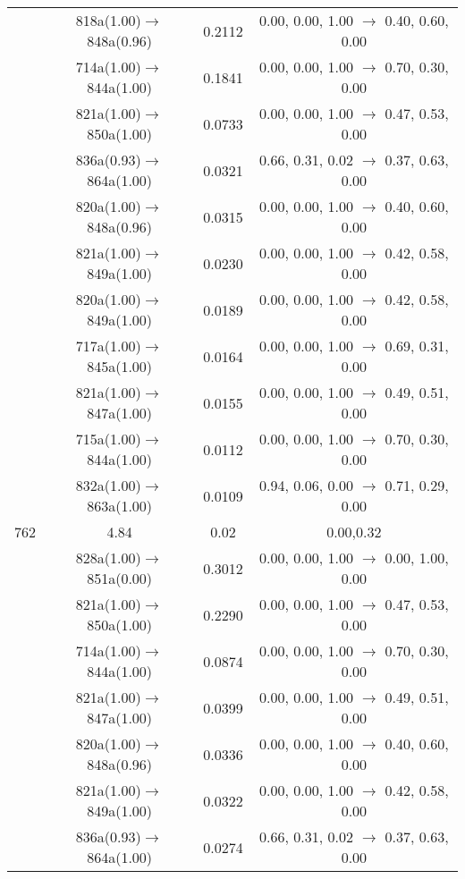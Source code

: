 \documentclass[10pt,a4paper]{article}
\begin{document}
\begin{longtable}{c|c|c|c}
 	& 818a(1.00)$\rightarrow$848a(0.96) &	 0.2112 &	 0.00, 0.00, 1.00 $\rightarrow$ 0.40, 0.60, 0.00 \\ 
 	& 714a(1.00)$\rightarrow$844a(1.00) &	 0.1841 &	 0.00, 0.00, 1.00 $\rightarrow$ 0.70, 0.30, 0.00 \\ 
 	& 821a(1.00)$\rightarrow$850a(1.00) &	 0.0733 &	 0.00, 0.00, 1.00 $\rightarrow$ 0.47, 0.53, 0.00 \\ 
 	& 836a(0.93)$\rightarrow$864a(1.00) &	 0.0321 &	 0.66, 0.31, 0.02 $\rightarrow$ 0.37, 0.63, 0.00 \\ 
 	& 820a(1.00)$\rightarrow$848a(0.96) &	 0.0315 &	 0.00, 0.00, 1.00 $\rightarrow$ 0.40, 0.60, 0.00 \\ 
 	& 821a(1.00)$\rightarrow$849a(1.00) &	 0.0230 &	 0.00, 0.00, 1.00 $\rightarrow$ 0.42, 0.58, 0.00 \\ 
 	& 820a(1.00)$\rightarrow$849a(1.00) &	 0.0189 &	 0.00, 0.00, 1.00 $\rightarrow$ 0.42, 0.58, 0.00 \\ 
 	& 717a(1.00)$\rightarrow$845a(1.00) &	 0.0164 &	 0.00, 0.00, 1.00 $\rightarrow$ 0.69, 0.31, 0.00 \\ 
 	& 821a(1.00)$\rightarrow$847a(1.00) &	 0.0155 &	 0.00, 0.00, 1.00 $\rightarrow$ 0.49, 0.51, 0.00 \\ 
 	& 715a(1.00)$\rightarrow$844a(1.00) &	 0.0112 &	 0.00, 0.00, 1.00 $\rightarrow$ 0.70, 0.30, 0.00 \\ 
 	& 832a(1.00)$\rightarrow$863a(1.00) &	 0.0109 &	 0.94, 0.06, 0.00 $\rightarrow$ 0.71, 0.29, 0.00 \\ 
 \hline762 &	 4.84 &	 0.02 &	 0.00,0.32 \\ 
  	& 828a(1.00)$\rightarrow$851a(0.00) &	 0.3012 &	 0.00, 0.00, 1.00 $\rightarrow$ 0.00, 1.00, 0.00 \\ 
 	& 821a(1.00)$\rightarrow$850a(1.00) &	 0.2290 &	 0.00, 0.00, 1.00 $\rightarrow$ 0.47, 0.53, 0.00 \\ 
 	& 714a(1.00)$\rightarrow$844a(1.00) &	 0.0874 &	 0.00, 0.00, 1.00 $\rightarrow$ 0.70, 0.30, 0.00 \\ 
 	& 821a(1.00)$\rightarrow$847a(1.00) &	 0.0399 &	 0.00, 0.00, 1.00 $\rightarrow$ 0.49, 0.51, 0.00 \\ 
 	& 820a(1.00)$\rightarrow$848a(0.96) &	 0.0336 &	 0.00, 0.00, 1.00 $\rightarrow$ 0.40, 0.60, 0.00 \\ 
 	& 821a(1.00)$\rightarrow$849a(1.00) &	 0.0322 &	 0.00, 0.00, 1.00 $\rightarrow$ 0.42, 0.58, 0.00 \\ 
 	& 836a(0.93)$\rightarrow$864a(1.00) &	 0.0274 &	 0.66, 0.31, 0.02 $\rightarrow$ 0.37, 0.63, 0.00 \\ 

\end{longtable}
\end{document}

